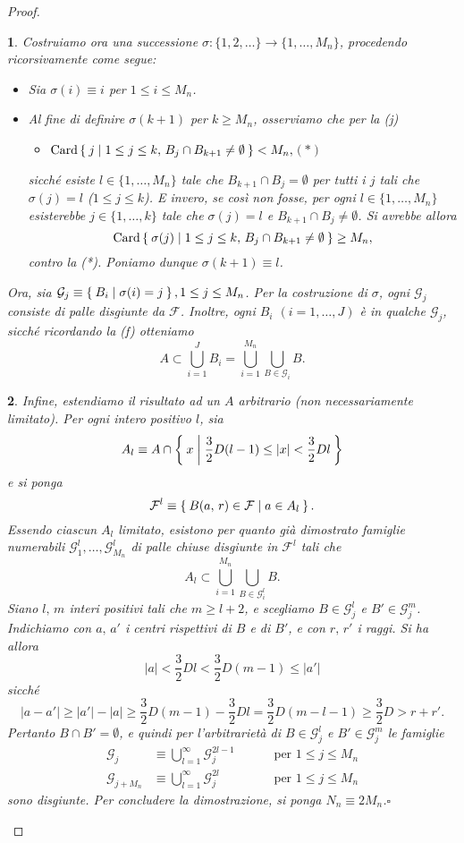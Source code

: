 \documentclass[a4paper,10pt,openright,oneside]{book}
\theoremstyle{theoremstyle}
\theoremstyle{theoremstylewoheader}
\theoremstyle{theoremstyle}
\theoremstyle{proofsecstyle}
\newtheorem{proofsec}{}
\theoremstyle{nonumberplain}
\newtheorem{proof}{Dim.}
\newcommand{\FF}{\ensuremath{\mathcal{F}}}
\newcommand{\GG}{\ensuremath{\mathcal{G}}}
\newcommand{\abs}[1]{\ensuremath{\lvert #1 \rvert}}
\DeclareMathOperator{\Card}{Card}
\renewcommand{\qedsymbol}{\ensuremath{\square}}
\newcommand{\qed}{\unskip\nobreak\hfill\nobreak\hspace{.5em}\qedsymbol}
\newcommand{\mymath}[2]{\begin{itemize}%
  \item[]\hfill\hbox{}\ensuremath{\displaystyle #1}\hfill\ensuremath{\displaystyle #2}%
  \end{itemize}}
\begin{document}
\begin{proof}
\begin{proofsec}
Costruiamo ora una successione $\sigma : \{1, 2, \ldots\} \rightarrow \{1, \ldots, M_n\}$, procedendo ricorsivamente come segue:
\begin{itemize}
\item[($\alpha$)] Sia $\sigma(i) \equiv i$ per $1 \le i \le M_n$.
\item[($\beta$)] Al fine di definire $\sigma(k+1)$ per $k \ge M_n$, osserviamo che per la (j) \mymath{\Card\Set{ j | 1 \le j \le k,\, B_j \cap B_{k+1} \ne \emptyset } < M_n,}{(*)}
sicché esiste $l \in \{1, \ldots, M_n\}$ tale che $B_{k+1} \cap B_j = \emptyset$ per tutti i $j$ tali che $\sigma(j) = l$ ($1 \le j \le k$). E invero, se così non fosse, per ogni $l \in \{1, \ldots, M_n\}$ esisterebbe $j \in \{1, \ldots, k\}$ tale che $\sigma(j) = l$ e $B_{k+1} \cap B_j \ne \emptyset$. Si avrebbe allora
\[
\Card\Set{ \sigma(j) | 1 \le j \le k,\, B_j \cap B_{k+1} \ne \emptyset } \ge M_n,
\]
contro la (*). Poniamo dunque $\sigma(k+1) \equiv l$.
\end{itemize}
Ora, sia $\GG_j \equiv \Set{ B_i | \sigma(i) = j }, 1 \le j \le M_n$. Per la costruzione di $\sigma$, ogni $\GG_j$ consiste di palle disgiunte da $\FF$. Inoltre, ogni $B_i$ $(i = 1, \ldots, J)$ è in qualche $\GG_j$, sicché ricordando la (f) otteniamo
\[
A \subset \bigcup_{i=1}^J B_i = \bigcup_{i=1}^{M_n} \bigcup_{B \in \GG_i} B.
\]
\end{proofsec}

\begin{proofsec}
Infine, estendiamo il risultato ad un $A$ arbitrario (non necessariamente limitato). Per ogni intero positivo $l$, sia
\[
A_l \equiv A \cap \Set{ x | \frac{3}{2}D(l - 1) \le \abs{x} < \frac{3}{2}Dl }
\]
e si ponga
\[
\FF^l \equiv \Set{ B(a,\, r) \in \FF | a \in A_l }.
\]
Essendo ciascun $A_l$ limitato, esistono per quanto già dimostrato famiglie numerabili $\GG_1^l, \ldots, \GG_{M_n}^l$ di palle chiuse disgiunte in $\FF^l$ tali che
\[
A_l \subset \bigcup_{i=1}^{M_n} \bigcup_{B \in \GG_i^l} B.
\]
Siano $l,\, m$ interi positivi tali che $m \ge l+2$, e scegliamo $B \in \GG_j^l$ e $B' \in \GG_j^m$. Indichiamo con $a,\, a'$ i centri rispettivi di $B$ e di $B'$, e con $r,\, r'$ i raggi. Si ha allora
\[
\abs{a} < \frac{3}{2}Dl < \frac{3}{2}D(m-1) \le \abs{a'}
\]
sicché
\[
\abs{a - a'} \ge \abs{a'} - \abs{a} \ge \frac{3}{2}D(m-1) - \frac{3}{2}Dl = \frac{3}{2}D(m-l-1) \ge \frac{3}{2}D > r + r'.
\]
Pertanto $B \cap B' = \emptyset$, e quindi per l'arbitrarietà di $B \in \GG_j^l$ e $B' \in \GG_j^m$ le famiglie
\begin{equation*}
\begin{aligned}
\GG_j &\equiv \bigcup_{l=1}^\infty \GG_j^{2l-1} & \qquad\text{ per $1 \le j \le M_n$}\\
\GG_{j+M_n} &\equiv \bigcup_{l=1}^\infty \GG_j^{2l} & \qquad\text{ per $1 \le j \le M_n$}
\end{aligned}
\end{equation*}
sono disgiunte. Per concludere la dimostrazione, si ponga $N_n \equiv 2M_n$.\qed
\end{proofsec}
\end{proof}
\end{document}
